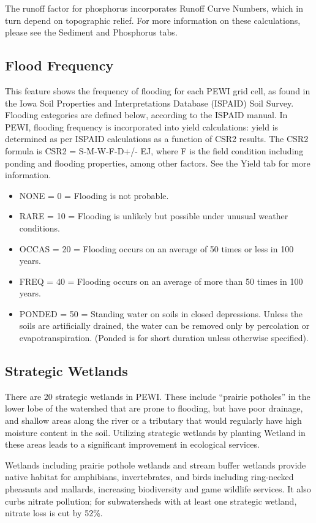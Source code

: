 \documentclass[11pt]{article}
\begin{document}
The runoff factor for phosphorus incorporates Runoff Curve Numbers, which in turn depend on topographic relief. For more information on these calculations, please see the Sediment and Phosphorus tabs.

\subsection{Flood Frequency}
This feature shows the frequency of flooding for each PEWI grid cell, as found in the Iowa Soil Properties and Interpretations Database (ISPAID) Soil Survey.\cite{25}  Flooding categories are defined below, according to the ISPAID manual. In PEWI, flooding frequency is incorporated into yield calculations: yield is determined as per ISPAID calculations as a function of CSR2 results. The CSR2 formula is CSR2 = S-M-W-F-D+/- EJ, where F is the field condition including ponding and flooding properties, among other factors.\cite{26}  See the Yield tab for more information.
\begin{itemize}
\item NONE	=	0	=	Flooding is not probable.
\item RARE	=	10	=	Flooding is unlikely but possible under unusual weather conditions.
\item OCCAS	=	20	=	Flooding occurs on an average of 50 times or less in 100 years.
\item FREQ	=	40	=	Flooding occurs on an average of more than 50 times in 100 years.
\item PONDED	=	50	=	Standing water on soils in closed depressions.  Unless the soils are artificially drained, the water can be removed only by percolation or evapotranspiration.  (Ponded is for short duration unless otherwise specified).
\end{itemize}

\subsection{Strategic Wetlands}
There are 20 strategic wetlands in PEWI. These include “prairie potholes” in the lower lobe of the watershed that are prone to flooding, but have poor drainage, and shallow areas along the river or a tributary that would regularly have high moisture content in the soil. Utilizing strategic wetlands by planting Wetland in these areas leads to a significant improvement in ecological services.

Wetlands including prairie pothole wetlands and stream buffer wetlands provide native habitat for amphibians, invertebrates, and birds including ring-necked pheasants and mallards,\cite{27}  increasing biodiversity and game wildlife services. It also curbs nitrate pollution; for subwatersheds with at least one strategic wetland, nitrate loss is cut by 52\%.\cite{28}
\end{document}
